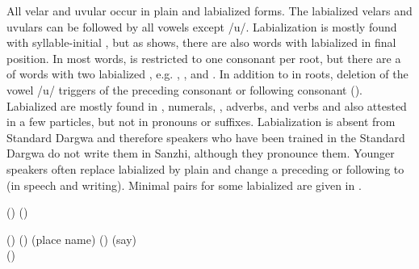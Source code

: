 All velar and uvular  occur in plain and labialized forms. The labialized velars and uvulars can be followed by all vowels except /u/. Labialization is mostly found with syllable-initial , but as  shows, there are also words with labialized  in final position. In most words,  is restricted to one consonant per root, but there are a  of words with two labialized , e.g.  ,  , and  . In addition to  in roots, deletion of the vowel /u/ triggers  of the preceding consonant or following consonant (). Labialized  are mostly found in , numerals, , adverbs, and verbs and also attested in a few particles, but not in pronouns or suffixes. Labialization is absent from Standard Dargwa and therefore speakers who have been trained in the Standard Dargwa  do not write them in Sanzhi, although they pronounce them. Younger speakers often replace labialized  by plain  and change a preceding or following  to  (in speech and writing). Minimal pairs for some labialized  are given in .
%
\begin{exe}
	\ex	\label{ex:labialization phon@A}
	\begin{xlist}
		\TabPositions{14em}
		\ex	{} () 	\tab {} () \label{ex:delqij phon}
		
		\ex	{} () 	\tab {} () 	\label{ex:bixwij phon}
		\ex	{}  (place name)	\tab {}  () \label{ex:akri phon}
		\ex	{} 	\tab {} 	(say) \label{ex:ikwij phon}\\
		() 
	\end{xlist}
\end{exe}


